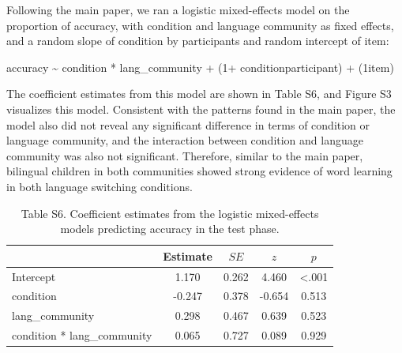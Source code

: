 \documentclass[
  man,floatsintext]{apa7}
\begin{document}
Following the main paper, we ran a logistic mixed-effects model on the proportion of accuracy, with condition and language community as fixed effects, and a random slope of condition by participants and random intercept of item:

accuracy \textasciitilde{} condition * lang\_community + (1+ condition\textbar participant) + (1\textbar item)

\noindent The coefficient estimates from this model are shown in Table S6, and Figure S3 visualizes this model. Consistent with the patterns found in the main paper, the model also did not reveal any significant difference in terms of condition or language community, and the interaction between condition and language community was also not significant. Therefore, similar to the main paper, bilingual children in both communities showed strong evidence of word learning in both language switching conditions.

\begin{table}[H]

\begin{center}
\begin{threeparttable}

\caption{\label{tab:unnamed-chunk-19}Table S6. Coefficient estimates from the logistic mixed-effects models predicting accuracy in the test phase.}

\begin{tabular}{lcccc}
\toprule
 & Estimate & $SE$ & $z$ & $p$\\
\midrule
Intercept & 1.170 & 0.262 & 4.460 & <.001\\
condition & -0.247 & 0.378 & -0.654 & 0.513\\
lang\_community & 0.298 & 0.467 & 0.639 & 0.523\\
condition * lang\_community & 0.065 & 0.727 & 0.089 & 0.929\\
\bottomrule
\end{tabular}

\end{threeparttable}
\end{center}

\end{table}
\end{document}
